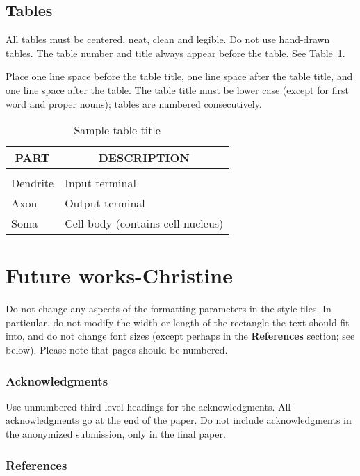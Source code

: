 \documentclass{article} %
\begin{document}
\subsection{Tables}

All tables must be centered, neat, clean and legible. Do not use hand-drawn
tables. The table number and title always appear before the table. See
Table~\ref{sample-table}.

Place one line space before the table title, one line space after the table
title, and one line space after the table. The table title must be lower case
(except for first word and proper nouns); tables are numbered consecutively.

\begin{table}[t]
\caption{Sample table title}
\label{sample-table}
\begin{center}
\begin{tabular}{ll}
\multicolumn{1}{c}{\bf PART}  &\multicolumn{1}{c}{\bf DESCRIPTION}
\\ \hline \\
Dendrite         &Input terminal \\
Axon             &Output terminal \\
Soma             &Cell body (contains cell nucleus) \\
\end{tabular}
\end{center}
\end{table}

\section{Future works-Christine}


Do not change any aspects of the formatting parameters in the style files.
In particular, do not modify the width or length of the rectangle the text
should fit into, and do not change font sizes (except perhaps in the
\textbf{References} section; see below). Please note that pages should be
numbered.

\subsubsection*{Acknowledgments}

Use unnumbered third level headings for the acknowledgments. All
acknowledgments go at the end of the paper. Do not include 
acknowledgments in the anonymized submission, only in the 
final paper. 

\subsubsection*{References}
\end{document}
